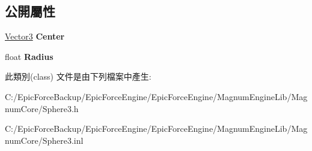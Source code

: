\subsection*{公開屬性}
\begin{DoxyCompactItemize}
\item 
\hyperlink{class_magnum_1_1_vector3}{Vector3} {\bfseries Center}\hypertarget{class_magnum_1_1_sphere3_a24c1535df187080f4f318e352aa37d65}{}\label{class_magnum_1_1_sphere3_a24c1535df187080f4f318e352aa37d65}

\item 
float {\bfseries Radius}\hypertarget{class_magnum_1_1_sphere3_a15bc7adf44e2134af81fa0088a86301c}{}\label{class_magnum_1_1_sphere3_a15bc7adf44e2134af81fa0088a86301c}

\end{DoxyCompactItemize}


此類別(class) 文件是由下列檔案中產生\+:\begin{DoxyCompactItemize}
\item 
C\+:/\+Epic\+Force\+Backup/\+Epic\+Force\+Engine/\+Epic\+Force\+Engine/\+Magnum\+Engine\+Lib/\+Magnum\+Core/Sphere3.\+h\item 
C\+:/\+Epic\+Force\+Backup/\+Epic\+Force\+Engine/\+Epic\+Force\+Engine/\+Magnum\+Engine\+Lib/\+Magnum\+Core/Sphere3.\+inl\end{DoxyCompactItemize}
